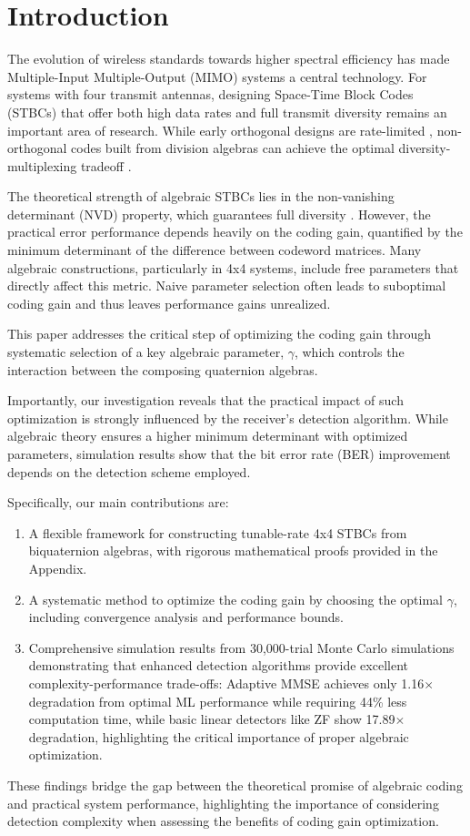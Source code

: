 \section{Introduction}
The evolution of wireless standards towards higher spectral efficiency has made Multiple-Input Multiple-Output (MIMO) systems a central technology. 
For systems with four transmit antennas, designing Space-Time Block Codes (STBCs) that offer both high data rates and full transmit diversity remains an important area of research. 
While early orthogonal designs are rate-limited \cite{1}, non-orthogonal codes built from division algebras can achieve the optimal diversity-multiplexing tradeoff \cite{2,3}.

The theoretical strength of algebraic STBCs lies in the non-vanishing determinant (NVD) property, which guarantees full diversity \cite{4}. However, the practical error performance depends heavily on the coding gain, quantified by the minimum determinant of the difference between codeword matrices. 
Many algebraic constructions, particularly in 4x4 systems, include free parameters that directly affect this metric. 
Naive parameter selection often leads to suboptimal coding gain and thus leaves performance gains unrealized.

This paper addresses the critical step of optimizing the coding gain through systematic selection of a key algebraic parameter, \(\gamma\), which controls the interaction between the composing quaternion algebras.

Importantly, our investigation reveals that the practical impact of such optimization is strongly influenced by the receiver's detection algorithm. 
While algebraic theory ensures a higher minimum determinant with optimized parameters, simulation results show that the bit error rate (BER) improvement depends on the detection scheme employed.

Specifically, our main contributions are:
\begin{enumerate}
    \item A flexible framework for constructing tunable-rate 4x4 STBCs from biquaternion algebras, with rigorous mathematical proofs provided in the Appendix.
    \item A systematic method to optimize the coding gain by choosing the optimal \(\gamma\), including convergence analysis and performance bounds.
    \item Comprehensive simulation results from 30,000-trial Monte Carlo simulations demonstrating that enhanced detection algorithms provide excellent complexity-performance trade-offs: Adaptive MMSE achieves only 1.16$\times$ degradation from optimal ML performance while requiring 44\% less computation time, while basic linear detectors like ZF show 17.89$\times$ degradation, highlighting the critical importance of proper algebraic optimization.
\end{enumerate}

These findings bridge the gap between the theoretical promise of algebraic coding and practical system performance, highlighting the importance of considering detection complexity when assessing the benefits of coding gain optimization.

